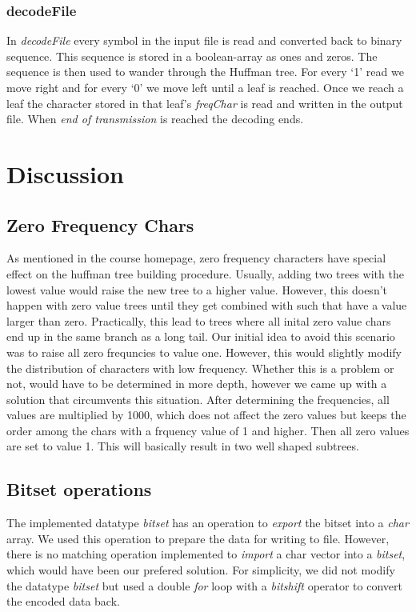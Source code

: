 \documentclass[a4paper,11pt,twoside]{article}
\begin{document}
\subsubsection{decodeFile}
In \emph{decodeFile} every symbol in the input file is read and converted back to binary sequence. This sequence is stored in a boolean-array as ones and zeros. The sequence is then used to wander through the Huffman tree. For every `1' read we move right and for every `0' we move left until a leaf is reached. Once we reach a leaf the character stored in that leaf's \emph{freqChar} is read and written in the output file. When \emph{end of transmission} is reached the decoding ends.

\section{Discussion}
\subsection{Zero Frequency Chars}
As mentioned in the course homepage, zero frequency characters have
special effect on the huffman tree building procedure. Usually, adding
two trees with the lowest value would raise the new tree to a higher
value. However, this doesn't happen with zero value trees until they
get combined with such that have a value larger than
zero. Practically, this lead to trees where all inital zero value
chars end up in the same branch as a long tail. Our initial idea to
avoid this scenario was to raise all zero frequncies to value
one. However, this would slightly modify the distribution of
characters with low frequency. Whether this is a problem or not, would
have to be determined in more depth, however we came up with a
solution that circumvents this situation. After determining the
frequencies, all values are multiplied by 1000, which does not affect
the zero values but keeps the order among the chars with a frquency
value of 1 and higher. Then all zero values are set to value 1. This
will basically result in two well shaped subtrees.  

\subsection{Bitset operations}
The implemented datatype \emph{bitset} has an operation to \emph{export} the
bitset into a \emph{char} array. We used this operation to prepare the
data for writing to file. However, there is no matching operation
implemented to \emph{import} a char vector into a \emph{bitset}, which
would have been our prefered solution. For simplicity, we did not
modify the datatype \emph{bitset} but used a double \emph{for} loop
with a \emph{bitshift} operator to convert the encoded data back. 
\end{document}
